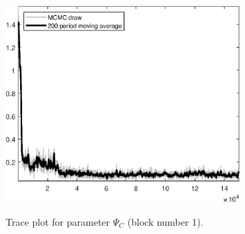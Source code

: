 \begin{figure}[H]
\centering
  \includegraphics[width=0.8\textwidth]{BRS_sectoral_KK/graphs/TracePlot_Psi_C_blck_1}\\
    \caption{Trace plot for parameter ${\Psi_{C}}$ (block number 1).}
\end{figure}
